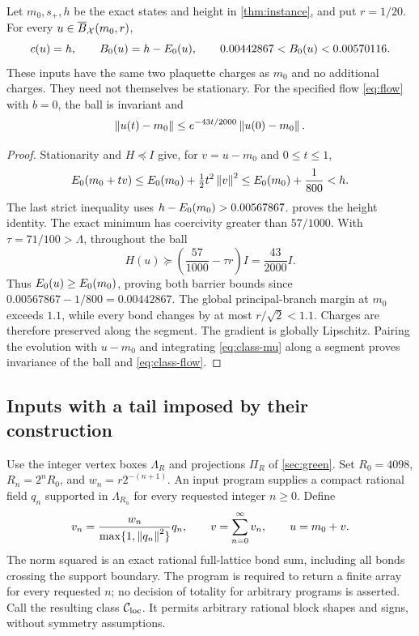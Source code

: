 \begin{theorem}\label{thm:local-class}
Let $m_0,s_+,h$ be the exact states and height in
\cref{thm:instance}, and put $r=1/20$. For every
$u\in\overline B_\mathcal X(m_0,r)$,
\begin{equation}\label{eq:class-height}
 c(u)=h,\qquad B_0(u)=h-E_0(u),\qquad
 0.00442867<B_0(u)<0.00570116.
\end{equation}
These inputs have the same two plaquette charges as $m_0$ and no
additional charges. They need not themselves be stationary.
For the specified flow \eqref{eq:flow} with $b=0$, the ball is invariant
and
\begin{equation}\label{eq:class-flow}
 \left\lVert u(t)-m_0\right\rVert\le
 e^{-43t/2000}\left\lVert u(0)-m_0\right\rVert.
\end{equation}
\end{theorem}
\begin{proof}
Stationarity and $H\preceq I$ give, for $v=u-m_0$ and $0\le t\le1$,
\[
 E_0(m_0+tv)\le E_0(m_0)+\tfrac12t^2\left\lVert v\right\rVert^2
 \le E_0(m_0)+\frac1{800}<h.
\]
The last strict inequality uses $h-E_0(m_0)>0.00567867$.
 proves the height identity. The exact minimum
has coercivity greater than $57/1000$. With $\tau=71/100>\Lambda$,
throughout the ball
\begin{equation}\label{eq:class-mu}
 H(u)\succeq\left(\frac{57}{1000}-\tau r\right)I
            =\frac{43}{2000}I.
\end{equation}
Thus $E_0(u)\ge E_0(m_0)$, proving both barrier bounds since
$0.00567867-1/800=0.00442867$. The global principal-branch margin
at $m_0$ exceeds $1.1$, while every bond changes by at most
$r/\sqrt2<1.1$. Charges are therefore preserved along the segment.
The gradient is globally Lipschitz. Pairing the evolution with $u-m_0$
and integrating \eqref{eq:class-mu} along a segment proves invariance
of the ball and \eqref{eq:class-flow}.
\end{proof}

\subsection{Inputs with a tail imposed by their construction}

Use the integer vertex boxes $\Lambda_R$ and projections $\Pi_R$ of
\cref{sec:green}. Set $R_0=4098$, $R_n=2^nR_0$, and
$w_n=r2^{-(n+1)}$. An input program supplies a compact rational field
$q_n$ supported in $\Lambda_{R_n}$ for every requested integer $n\ge0$.
Define
\begin{equation}\label{eq:class-blocks}
 v_n=\frac{w_n}{\max\{1,\left\lVert q_n\right\rVert^2\}}q_n,\qquad
 v=\sum_{n=0}^{\infty}v_n,\qquad u=m_0+v.
\end{equation}
The norm squared is an exact rational full-lattice bond sum, including
all bonds crossing the support boundary. The program is required to
return a finite array for every requested $n$; no decision of totality
for arbitrary programs is asserted. Call the resulting class
$\mathcal C_{\rm loc}$. It permits arbitrary rational block shapes
and signs, without symmetry assumptions.

